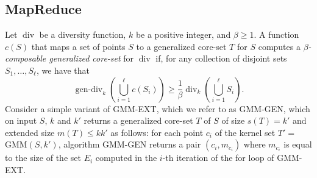 \documentclass{article}
\DeclareMathOperator{\diversity}{div}
\DeclareMathOperator{\gendiv}{gen-div}
\begin{document}
\subsection{MapReduce}
\label{sec:gen-mapreduce}
Let $\diversity$ be a diversity function, $k$ be a positive
integer, and $\beta \ge 1$. A function $c(S)$ that maps a set of
points $S$ to a generalized core-set $T$ for $S$ computes a
\emph{$\beta$-composable generalized core-set} for $\diversity$ if,
for any collection of disjoint sets $S_1,\dots, S_\ell$, we have that
\[
  \gendiv_k\left(\bigcup_{i=1}^\ell c(S_i)\right) \ge
  \frac{1}{\beta} \diversity_k\left(\bigcup_{i=1}^\ell S_i\right).
\]
Consider a simple variant of {\sc GMM-EXT}, which we refer to as {\sc
  GMM-GEN}, which on input $S$, $k$ and $k'$ returns a generalized
core-set $T$ of $S$ of size $s(T)=k'$ and extended size
$m(T) \leq k k'$ as follows: for each point $c_i$ of the kernel set
$T' =$ {\sc GMM}$(S,k')$, algorithm {\sc GMM-GEN} returns a pair
$(c_i,m_{c_i})$ where $m_{c_i}$ is equal to the size of the set $E_i$
computed in the $i$-th iteration of the for loop of {\sc GMM-EXT}. 
\end{document}
